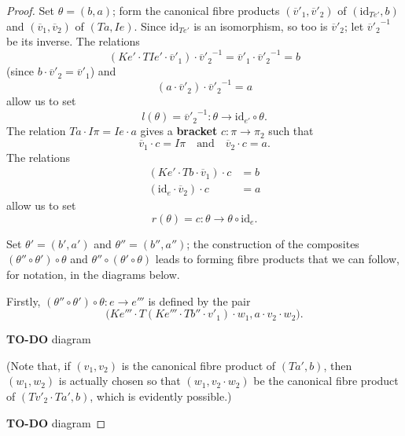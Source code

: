 \documentclass[fleqn]{article}
\newcommand{\oldpage}[1]{\marginpar{\footnotesize$\Big\vert$ \textit{p.~#1}}}
\newcommand{\todo}{{\color{purple}\textbf{TO-DO }}}
\newcommand{\unsure}[1]{{\color{purple}\textbf{#1}}}
\newcommand{\id}{\mathrm{id}}
\newcommand{\textand}{\quad\text{and}\quad}
\begin{document}
\begin{proof}
  Set $\theta=(b,a)$;
  form the canonical fibre products $(\overline{v}'_1,\overline{v}'_2)$ of $(\id_{Te'},b)$ and $(\overline{v}_1,\overline{v}_2)$ of $(Ta,Ie)$.
  Since $\id_{Te'}$ is an isomorphism, so too is $\overline{v}'_2$;
  let ${\overline{v}'_2}^{-1}$ be its inverse.
  The relations
  \[
    (Ke'\cdot TIe'\cdot\overline{v}'_1)\cdot{\overline{v}'_2}^{-1}
    = \overline{v}'_1\cdot{\overline{v}'_2}^{-1}
    = b
  \]
  (since $b\cdot\overline{v}'_2=\overline{v}'_1$) and
  \[
    (a\cdot\overline{v}'_2)\cdot{\overline{v}'_2}^{-1}
    = a
  \]
  allow us to set
  \[
    l(\theta)
    = {\overline{v}'_2}^{-1}
    \colon\theta
    \to \id_{e'}\circ\theta.
  \]
  The relation $Ta\cdot I\pi=Ie\cdot a$ gives a \unsure{bracket} $c\colon\pi\to\pi_2$ such that
  \[
    \overline{v}_1\cdot c = I\pi
    \textand
    \overline{v}_2\cdot c = a.
  \]
  The relations
  \[
    \begin{aligned}
      (Ke'\cdot Tb\cdot\overline{v}_1)\cdot c
      &= b
    \\(\id_e\cdot\overline{v}_2)\cdot c
      &= a
    \end{aligned}
  \]
  allow us to set
  \[
    r(\theta)
    = c
    \colon\theta
    \to\theta\circ\id_e.
  \]

  Set $\theta'=(b',a')$ and $\theta''=(b'',a'')$;
  the construction of the composites $(\theta''\circ\theta')\circ\theta$ and $\theta''\circ(\theta'\circ\theta)$ leads to forming fibre products that we can follow, for notation, in the diagrams below.

  \oldpage{250}
  Firstly, $(\theta''\circ\theta')\circ\theta\colon e\to e'''$ is defined by the pair
  \[
    \big(
      Ke'''\cdot T(Ke'''\cdot Tb''\cdot v'_1)\cdot w_1,
      a\cdot v_2\cdot w_2
    \big).
  \]

  \todo{diagram}

  (Note that, if $(v_1,v_2)$ is the canonical fibre product of $(Ta',b)$, then $(w_1,w_2)$ is actually chosen so that $(w_1,v_2\cdot w_2)$ be the canonical fibre product of $(Tv'_2\cdot Ta',b)$, which is evidently possible.)

  \todo{diagram}


\end{proof}
\end{document}
